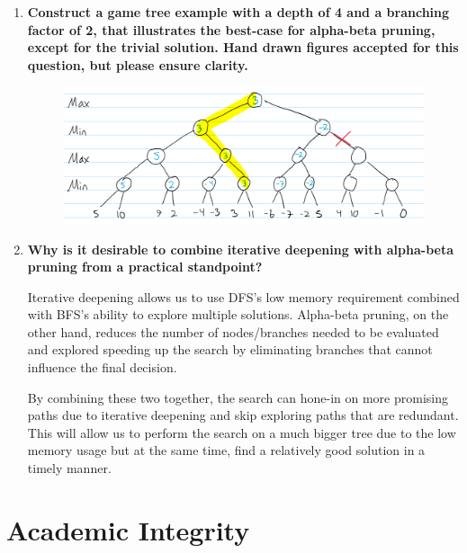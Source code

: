 \documentclass[a4paper]{article}
\begin{document}
\begin{sloppypar}
\begin{enumerate}[start=12,label=Q\arabic*,left=0pt]
    \item \textbf{Construct a game tree example with a depth of 4 and a branching factor of 2, that illustrates the best-case for alpha-beta pruning, except for the trivial solution. Hand drawn figures accepted for this question, but please ensure clarity.}
    \begin{figure}[H]
        \centering  
        \includegraphics[height=0.2\textheight]{Q12_tree.png}
        \label{fig:Q12_tree}
    \end{figure}

    \item \textbf{Why is it desirable to combine iterative deepening with alpha-beta pruning from a practical standpoint?}
    \par Iterative deepening allows us to use DFS's low memory requirement combined with BFS's ability to explore multiple solutions.
    Alpha-beta pruning, on the other hand, reduces the number of nodes/branches needed to be evaluated and explored speeding up the search
    by eliminating branches that cannot influence the final decision.

    By combining these two together, the search can hone-in on more promising paths due to iterative deepening and
    skip exploring paths that are redundant. This will allow us to perform the search on a much bigger tree due to the low memory usage
    but at the same time, find a relatively good solution in a timely manner.

\end{enumerate}

\section{Academic Integrity}


\end{sloppypar}
\end{document}
